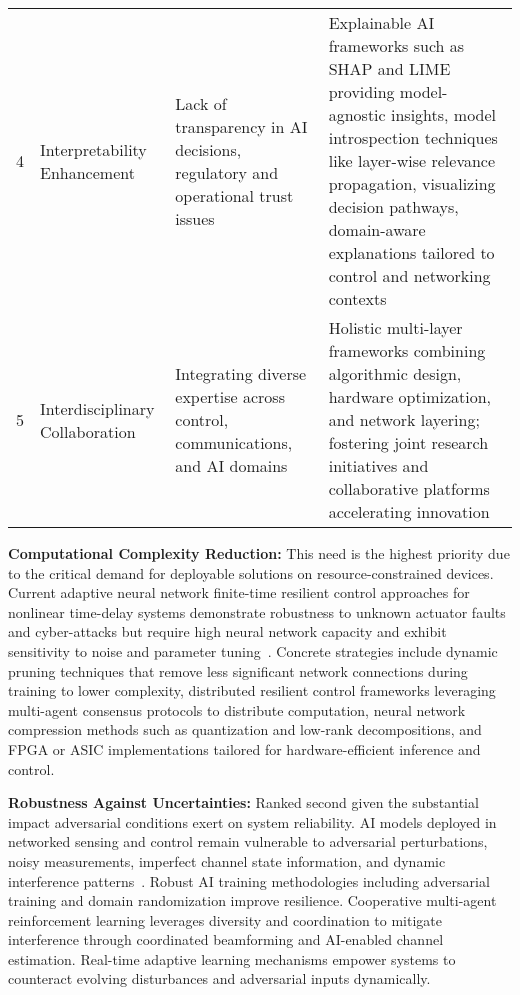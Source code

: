 \documentclass[sigconf]{acmart}
\begin{document}
\begin{table*}[htbp]
\begin{adjustbox}{max width=\textwidth}
\begin{tabular}{@{}llll@{}}
4 & Interpretability Enhancement & Lack of transparency in AI decisions, regulatory and operational trust issues & Explainable AI frameworks such as SHAP and LIME providing model-agnostic insights, model introspection techniques like layer-wise relevance propagation, visualizing decision pathways, domain-aware explanations tailored to control and networking contexts \\
5 & Interdisciplinary Collaboration & Integrating diverse expertise across control, communications, and AI domains & Holistic multi-layer frameworks combining algorithmic design, hardware optimization, and network layering; fostering joint research initiatives and collaborative platforms accelerating innovation \\ \bottomrule
\end{tabular}
\end{adjustbox}
\end{table*}

\textbf{Computational Complexity Reduction:} This need is the highest priority due to the critical demand for deployable solutions on resource-constrained devices. Current adaptive neural network finite-time resilient control approaches for nonlinear time-delay systems demonstrate robustness to unknown actuator faults and cyber-attacks but require high neural network capacity and exhibit sensitivity to noise and parameter tuning~\cite{ref46}. Concrete strategies include dynamic pruning techniques that remove less significant network connections during training to lower complexity, distributed resilient control frameworks leveraging multi-agent consensus protocols to distribute computation, neural network compression methods such as quantization and low-rank decompositions, and FPGA or ASIC implementations tailored for hardware-efficient inference and control.

\textbf{Robustness Against Uncertainties:} Ranked second given the substantial impact adversarial conditions exert on system reliability. AI models deployed in networked sensing and control remain vulnerable to adversarial perturbations, noisy measurements, imperfect channel state information, and dynamic interference patterns~\cite{ref48}. Robust AI training methodologies including adversarial training and domain randomization improve resilience. Cooperative multi-agent reinforcement learning leverages diversity and coordination to mitigate interference through coordinated beamforming and AI-enabled channel estimation. Real-time adaptive learning mechanisms empower systems to counteract evolving disturbances and adversarial inputs dynamically.
\end{document}
